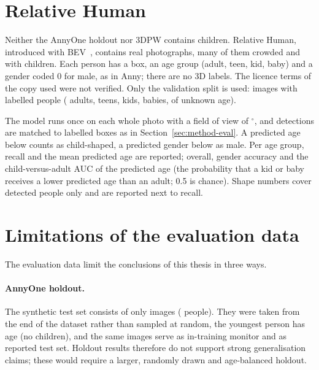 \section{Relative Human}
\label{sec:data-rh}

Neither the AnnyOne holdout nor 3DPW contains children. Relative Human, introduced with BEV~\cite{sun2022bev},
contains \DataRHImages{} real photographs, many of them crowded and with children. Each person has a box, an age group
(adult, teen, kid, baby) and a gender coded 0 for male, as in Anny; there are no 3D labels. The licence terms of the copy used were not verified.
Only the validation split is used: \DataRHValImages{} images with \DataRHValPeople{} labelled people (\DataRHValAdults{} adults,
\DataRHValTeens{} teens, \DataRHValKids{} kids, \DataRHValBabies{} babies, \DataRHValUnknownAge{} of unknown age).

The model runs once on each whole photo with a field of view of \DataRHFov$^\circ$, and detections are matched to
labelled boxes as in Section~\ref{sec:method-eval}. A predicted age below \DataRHChildThr{} counts as child-shaped, a
predicted gender below \DataRHGenderThr{} as male. Per age group, recall and the mean predicted age are reported;
overall, gender accuracy and the child-versus-adult AUC of the predicted age (the probability that a kid or baby
receives a lower predicted age than an adult; 0.5 is chance). Shape numbers cover detected people only and are
reported next to recall.

\section{Limitations of the evaluation data}
\label{sec:data-limits}

The evaluation data limit the conclusions of this thesis in three ways.

\paragraph{AnnyOne holdout.} The synthetic test set consists of only \MethodHoldoutN{} images
(\MethodHoldoutPeople{} people). They were taken from the end of the dataset rather than sampled at random, the
youngest person has age \DataHoldoutMinAge{} (no children), and the same images serve as in-training monitor and as
reported test set. Holdout results therefore do not support strong generalisation claims; these would require a larger,
randomly drawn and age-balanced holdout.

